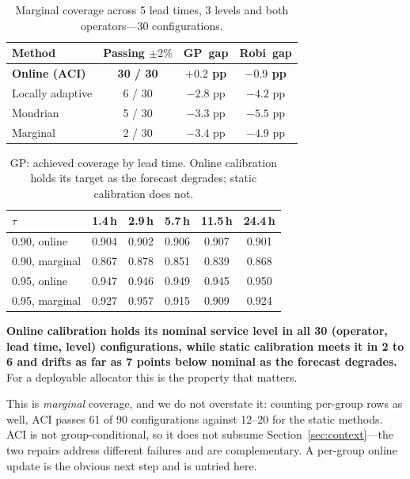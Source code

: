 \documentclass[conference]{IEEEtran}
\newcommand{\gpx}{GP}
\newcommand{\robix}{Robi}
\begin{document}
\begin{table}[htbp]
\caption{Marginal coverage across 5 lead times, 3 levels and both operators---30
configurations.}
\label{tab:aci}
\centering
\begin{tabular}{lccc}
\toprule
\textbf{Method} & \textbf{Passing $\pm 2\%$} & \textbf{\gpx\ gap} & \textbf{\robix\ gap} \\
\midrule
\textbf{Online (ACI)} & \textbf{30 / 30} & \textbf{$+0.2$ pp} & \textbf{$-0.9$ pp} \\
Locally adaptive & 6 / 30 & $-2.8$ pp & $-4.2$ pp \\
Mondrian & 5 / 30 & $-3.3$ pp & $-5.5$ pp \\
Marginal & 2 / 30 & $-3.4$ pp & $-4.9$ pp \\
\bottomrule
\end{tabular}
\end{table}

\begin{table}[htbp]
\caption{\gpx: achieved coverage by lead time. Online calibration holds its target as
the forecast degrades; static calibration does not.}
\label{tab:acilead}
\centering
\setlength{\tabcolsep}{4pt}
\begin{tabular}{lccccc}
\toprule
$\tau$ & 1.4\,h & 2.9\,h & 5.7\,h & 11.5\,h & 24.4\,h \\
\midrule
0.90, online & 0.904 & 0.902 & 0.906 & 0.907 & 0.901 \\
0.90, marginal & 0.867 & 0.878 & 0.851 & 0.839 & 0.868 \\
0.95, online & 0.947 & 0.946 & 0.949 & 0.945 & 0.950 \\
0.95, marginal & 0.927 & 0.957 & 0.915 & 0.909 & 0.924 \\
\bottomrule
\end{tabular}
\end{table}

\textbf{Online calibration holds its nominal service level in all 30 (operator, lead
time, level) configurations, while static calibration meets it in 2 to 6 and drifts as
far as 7 points below nominal as the forecast degrades.} For a deployable allocator
this is the property that matters.

This is \emph{marginal} coverage, and we do not overstate it: counting per-group rows
as well, ACI passes 61 of 90 configurations against 12--20 for the static methods. ACI
is not group-conditional, so it does not subsume Section~\ref{sec:context}---the two
repairs address different failures and are complementary. A per-group online update is
the obvious next step and is untried here.
\end{document}
